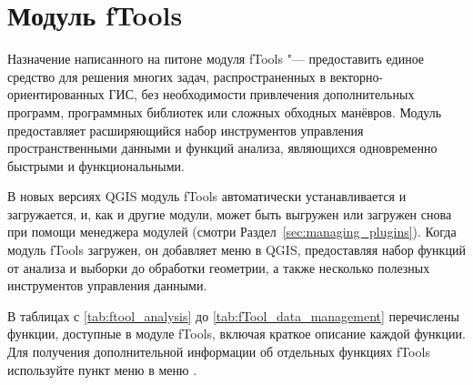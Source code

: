 
\section{Модуль fTools}\label{sec:ftools}



Назначение написанного на питоне модуля fTools "--- предоставить единое
средство для решения многих задач, распространенных в векторно-ориентированных
ГИС, без необходимости привлечения дополнительных программ, программных
библиотек или сложных обходных манёвров. Модуль предоставляет расширяющийся
набор инструментов управления пространственными данными и функций анализа,
являющихся одновременно быстрыми и функциональными.

В новых версиях QGIS модуль fTools автоматически устанавливается и загружается,
и, как и другие модули, может быть выгружен или загружен снова при помощи
менеджера модулей (смотри Раздел~\ref{sec:managing_plugins}). Когда модуль
fTools загружен, он добавляет меню  в QGIS, предоставляя
набор функций от анализа и выборки до обработки геометрии, а также несколько
полезных инструментов управления данными.

\label{ftool_functions}

В таблицах с \ref{tab:ftool_analysis} до \ref{tab:fTool_data_management}
перечислены функции, доступные в модуле fTools, включая краткое описание
каждой функции. Для получения дополнительной информации об отдельных
функциях fTools используйте пункт меню 
в меню .

